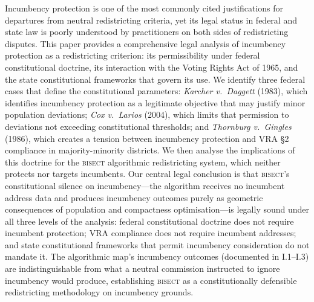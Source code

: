 Incumbency protection is one of the most commonly cited justifications for departures
from neutral redistricting criteria, yet its legal status in federal and state law
is poorly understood by practitioners on both sides of redistricting disputes. This
paper provides a comprehensive legal analysis of incumbency protection as a redistricting
criterion: its permissibility under federal constitutional doctrine, its interaction
with the Voting Rights Act of 1965, and the state constitutional frameworks that govern
its use. We identify three federal cases that define the constitutional parameters:
\textit{Karcher v.\ Daggett} (1983), which identifies incumbency protection as a
legitimate objective that may justify minor population deviations; \textit{Cox v.\
Larios} (2004), which limits that permission to deviations not exceeding constitutional
thresholds; and \textit{Thornburg v.\ Gingles} (1986), which creates a tension between
incumbency protection and VRA \S{}2 compliance in majority-minority districts. We then
analyse the implications of this doctrine for the \textsc{bisect} algorithmic redistricting
system, which neither protects nor targets incumbents. Our central legal conclusion is
that \textsc{bisect}'s constitutional silence on incumbency---the algorithm receives no
incumbent address data and produces incumbency outcomes purely as geometric consequences
of population and compactness optimisation---is legally sound under all three levels of
the analysis: federal constitutional doctrine does not require incumbent protection;
VRA compliance does not require incumbent addresses; and state constitutional frameworks
that permit incumbency consideration do not mandate it. The algorithmic map's incumbency
outcomes (documented in I.1--I.3) are indistinguishable from what a neutral commission
instructed to ignore incumbency would produce, establishing \textsc{bisect} as a
constitutionally defensible redistricting methodology on incumbency grounds.
